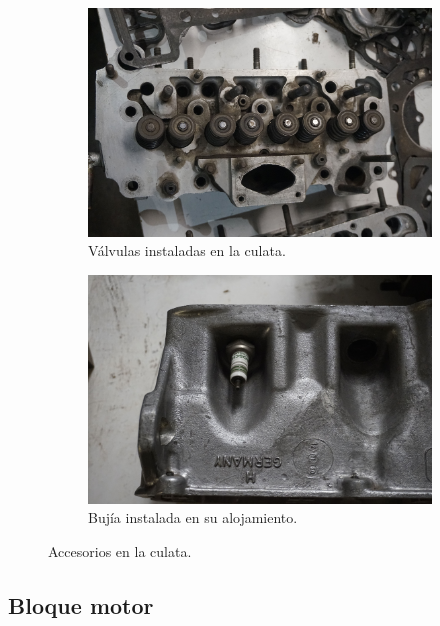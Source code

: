 \begin{figure}[H]
	\centering
	\begin{subfigure}[b]{0.45\textwidth}
		\centering
		\includegraphics[width=\linewidth]{Figures/02/m3/head_top_val.jpg}
		\caption{Válvulas instaladas en la culata.}
		\label{fig:C_gas}
	\end{subfigure}
	\hfill
	\begin{subfigure}[b]{0.45\textwidth}
 		\centering
 		\includegraphics[width=\linewidth]{Figures/02/m3/head_sparkplug.jpg}
 		\caption{Bujía instalada en su alojamiento.}
		\label{fig:C_diesel}
	\end{subfigure}    
	\caption{Accesorios en la culata.}
	\label{fig:C_accesory}
\end{figure}

\subsection{Bloque motor} \label{ss:bloque}

